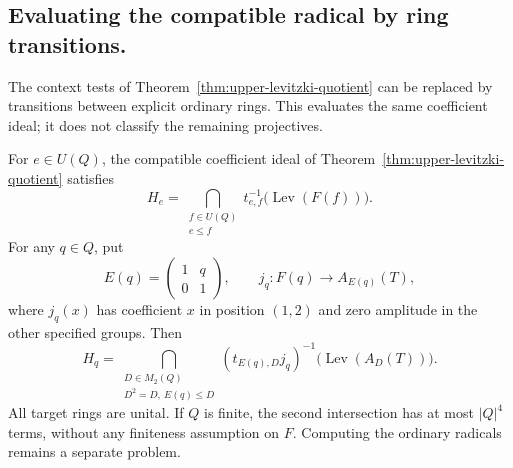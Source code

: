 \subsection{Evaluating the compatible radical by ring transitions.}
The context tests of Theorem~\ref{thm:upper-levitzki-quotient} can be
replaced by transitions between explicit ordinary rings. This evaluates
the same coefficient ideal; it does not classify the remaining projectives.

\begin{proposition}\label{prop:upper-transition-radical}
For $e\in U(Q)$, the compatible coefficient ideal of
Theorem~\ref{thm:upper-levitzki-quotient} satisfies
\[
 H_e=\bigcap_{\substack{f\in U(Q)\\e\leq f}}
       t_{e,f}^{-1}\bigl(\operatorname{Lev}(F(f))\bigr).
\]
For any $q\in Q$, put
\[
 E(q)=\begin{pmatrix}1&q\\0&1\end{pmatrix},
 \qquad
 j_q:F(q)\longrightarrow A_{E(q)}(T),
\]
where $j_q(x)$ has coefficient $x$ in position $(1,2)$ and zero
amplitude in the other specified groups. Then
\[
 H_q=\bigcap_{\substack{D\in M_2(Q)\\D^2=D,\ E(q)\leq D}}
 (t_{E(q),D}j_q)^{-1}\bigl(\operatorname{Lev}(A_D(T))\bigr).
\]
All target rings are unital. If $Q$ is finite, the second intersection
has at most $|Q|^4$ terms, without any finiteness assumption on $F$.
Computing the ordinary radicals remains a separate problem.
\end{proposition}

